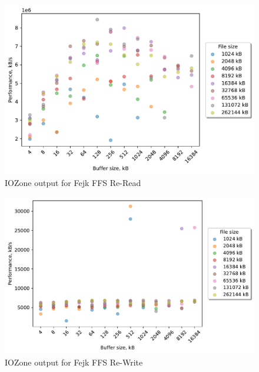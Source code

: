 \begin{figure}[!htb]
	\label{fig:bench_fffs_re_read}
	\begin{center}
		\includegraphics[width=1.0\textwidth]{figures/benchmarking/fejk-ffs/Re-Read.pdf}
	\end{center}
	\caption{IOZone output for Fejk FFS \mbox{Re-Read}}
\end{figure}

\begin{figure}[!htb]
	\label{fig:bench_fffs_re_write}
	\begin{center}
		\includegraphics[width=1.0\textwidth]{figures/benchmarking/fejk-ffs/Re-Write.pdf}
	\end{center}
	\caption{IOZone output for Fejk FFS \mbox{Re-Write}}
\end{figure}

